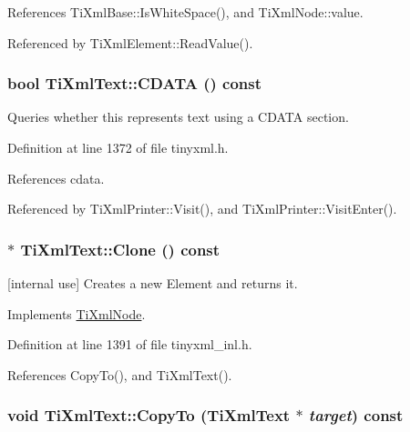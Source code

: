 References TiXmlBase::IsWhiteSpace(), and TiXmlNode::value.

Referenced by TiXmlElement::ReadValue().\hypertarget{class_ti_xml_text_ad1a6a6b83fa2271022dd97c072a2b586}{
\subsubsection[{CDATA}]{\setlength{\rightskip}{0pt plus 5cm}bool TiXmlText::CDATA () const}}
\label{class_ti_xml_text_ad1a6a6b83fa2271022dd97c072a2b586}


Queries whether this represents text using a CDATA section. 

Definition at line 1372 of file tinyxml.h.

References cdata.

Referenced by TiXmlPrinter::Visit(), and TiXmlPrinter::VisitEnter().\hypertarget{class_ti_xml_text_adde1869dfb029be50713fbfd8ce4d21f}{
\subsubsection[{Clone}]{ $\ast$ TiXmlText::Clone () const}}
\label{class_ti_xml_text_adde1869dfb029be50713fbfd8ce4d21f}


\mbox{[}internal use\mbox{]} Creates a new Element and returns it. 

Implements \hyperlink{class_ti_xml_node_a4508cc3a2d7a98e96a54cc09c37a78a4}{TiXmlNode}.

Definition at line 1391 of file tinyxml\_\-inl.h.

References CopyTo(), and TiXmlText().\hypertarget{class_ti_xml_text_adcec7d9b6fccfc5777452bb97e6031c1}{
\subsubsection[{CopyTo}]{\setlength{\rightskip}{0pt plus 5cm}void TiXmlText::CopyTo ({\bf TiXmlText} $\ast$ {\em target}) const}}
\label{class_ti_xml_text_adcec7d9b6fccfc5777452bb97e6031c1}


